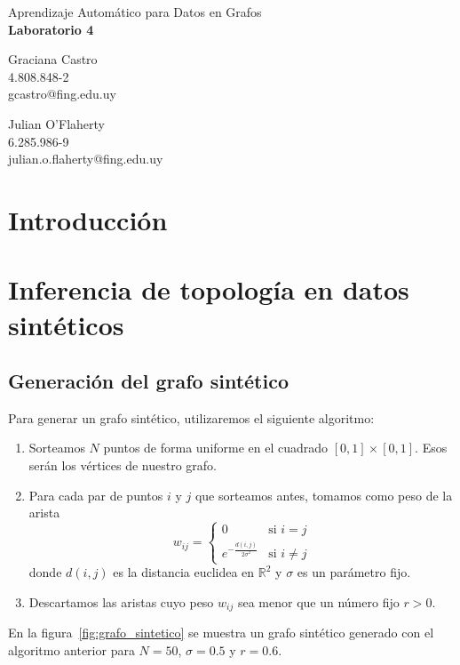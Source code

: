 \documentclass{article}
\begin{document}
\begin{center}
    {\Large Aprendizaje Automático para Datos en Grafos} \\
    {\LARGE \textbf{Laboratorio 4}} \\
    \vspace{2em}
    \begin{minipage}{0.45\textwidth}
        \centering
        Graciana Castro \\
        4.808.848-2 \\
        gcastro@fing.edu.uy
    \end{minipage}
    \hfill
    \begin{minipage}{0.45\textwidth}
        \centering
        Julian O'Flaherty \\
        6.285.986-9 \\
        julian.o.flaherty@fing.edu.uy
    \end{minipage}
\end{center}


\section{Introducción}

\section{Inferencia de topología en datos sintéticos}

\subsection{Generación del grafo sintético}

Para generar un grafo sintético, utilizaremos el siguiente algoritmo:
\begin{enumerate}
    \item Sorteamos $N$ puntos de forma uniforme en el cuadrado $[0,1] \times [0,1]$. Esos serán los vértices de nuestro grafo.
    \item Para cada par de puntos $i$ y $j$ que sorteamos antes, tomamos como peso de la arista
    \begin{equation*}
        w_{ij} = \begin{cases}
            0 & \text{si } i=j \\
            e^{-\frac{d(i,j)}{2\sigma^2}} & \text{si } i \neq j
        \end{cases}
    \end{equation*}
    donde $d(i,j)$ es la distancia euclidea en $\mathbb{R}^2$ y $\sigma$ es un parámetro fijo.
    \item Descartamos las aristas cuyo peso $w_{ij}$ sea menor que un número fijo $r>0$.
\end{enumerate}
En la figura~\ref{fig:grafo_sintetico} se muestra un grafo sintético generado con el algoritmo anterior para $N=50$, $\sigma=0.5$ y $r=0.6$.
\end{document}

